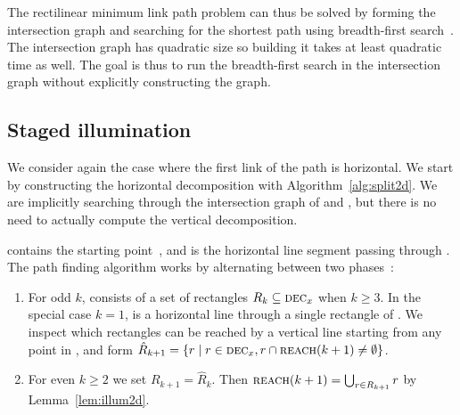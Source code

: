 \documentclass[english,gradu]{tktltiki2018}
\begin{document}
The rectilinear minimum link path problem can thus be solved by forming the intersection graph and searching for the shortest path using breadth-first search~\cite{dasnar}.
The intersection graph has quadratic size so building it takes at least quadratic time as well.
The goal is thus to run the breadth-first search in the intersection graph without explicitly constructing the graph.

\subsection{Staged illumination}

We consider again the case where the first link of the path is horizontal.
We start by constructing the horizontal decomposition with Algorithm~\ref{alg:split2d}.
We are implicitly searching through the intersection graph of  and , but there is no need to actually compute the vertical decomposition.

 contains the starting point~\spt, and  is the horizontal line segment passing through \spt.
The path finding algorithm works by alternating between two phases~\cite{revisited}:

\begin{enumerate}
\item For odd $k$,  consists of a set of rectangles $R_k\subseteq\textsc{dec}_{x}$ when $k\ge 3$.
	In the special case $k=1$,  is a horizontal line through a single rectangle of .
	We inspect which rectangles can be reached by a vertical line starting from any point in , and form $\hat{R}_{k+1}=\left\{r \mid r\in\textsc{dec}_{x}, r\cap\textsc{reach}(k+1)\neq\emptyset\right\}$.
\item For even $k\ge 2$ we set $R_{k+1}=\hat{R}_k$.
	Then $\textsc{reach}(k+1)=\bigcup_{r\in R_{k+1}}r$ by Lemma~\ref{lem:illum2d}.
\end{enumerate}
\end{document}
